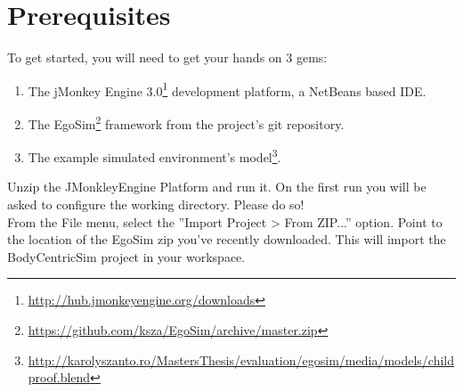 \section{Prerequisites} %
\label{sec:sd_prerequisites}
To get started, you will need to get your hands on 3 gems:
\begin{enumerate}
	\item The jMonkey Engine 3.0\footnote{\url{http://hub.jmonkeyengine.org/downloads}} development platform, a NetBeans based IDE.
	\item The EgoSim\footnote{\url{https://github.com/ksza/EgoSim/archive/master.zip}} framework from the project's git repository.
	\item The example simulated environment's model\footnote{\url{http://karolyszanto.ro/MastersThesis/evaluation/egosim/media/models/childproof.blend}}.
\end{enumerate}

Unzip the JMonkleyEngine Platform and run it. On the first run you will be asked to configure the working directory. Please do so!\\

From the File menu, select the ''Import Project > From ZIP...'' option. Point to the location of the EgoSim zip you've recently downloaded. This will import the BodyCentricSim project in your workspace.
